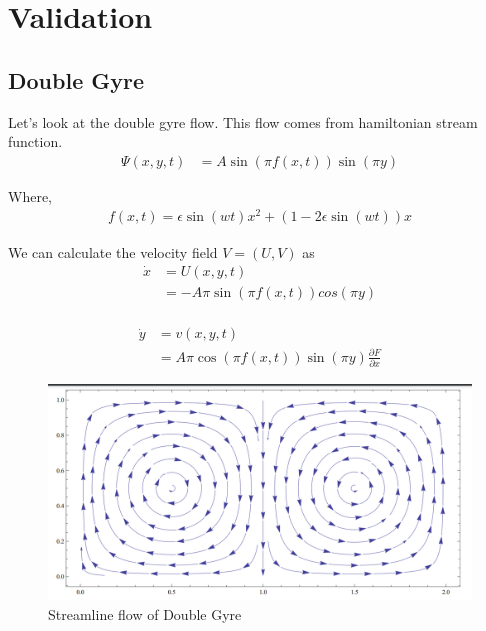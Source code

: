 \documentclass[../report.tex]{subfiles}
\begin{document}
\chapter{Validation}

\section{Double Gyre}
Let's look at the double gyre flow. This flow comes from hamiltonian stream function.
\begin{equation}
  \begin{aligned}
    \Psi(x, y, t) &= A\sin(\pi f(x, t)) \sin(\pi y)
  \end{aligned}
\end{equation}

Where,
\begin{equation}
  \begin{aligned}
    f(x, t) = \epsilon\sin(wt) x^2 + (1 - 2 \epsilon \sin(wt))x
  \end{aligned}
\end{equation}

We can calculate the velocity field \(V = (U, V)\) as
\begin{equation}
  \begin{aligned}
    \dot x &= U(x, y, t) \\
    &= -A\pi\sin(\pi f(x, t)) cos(\pi y) \\
  \end{aligned}
\end{equation}

\begin{equation}
  \begin{aligned}
    \dot y &= v(x, y, t) \\
    &= A\pi\cos(\pi f(x, t)) \sin(\pi y) \frac{\partial F}{\partial x}
  \end{aligned}
\end{equation}

\begin{figure}[H]
  \centering
  \includegraphics[width=0.8\linewidth]{images/image_2.png}
  \caption{Streamline flow of Double Gyre}
  \label{figg:fig_2}
\end{figure}
\end{document}
